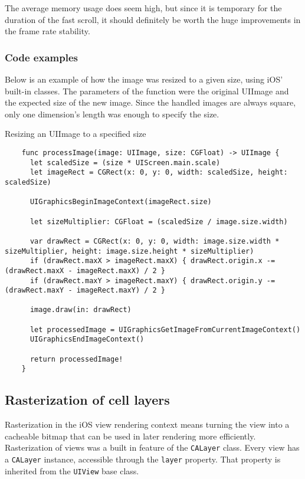 \documentclass[a4paper,12pt]{article}
\begin{document}
The average memory usage does seem high, but since it is temporary for the duration of the fast scroll, it should definitely be worth the huge improvements in the frame rate stability.

\subsubsection*{Code examples}
Below is an example of how the image was resized to a given size, using iOS' built-in classes. The parameters of the function were the original UIImage and the expected size of the new image. Since the handled images are always square, only one dimension's length was enough to specify the size.
\begin{listing}[H]
  \caption{Resizing an UIImage to a specified size}
  \begin{verbatim}
    func processImage(image: UIImage, size: CGFloat) -> UIImage {
      let scaledSize = (size * UIScreen.main.scale)
      let imageRect = CGRect(x: 0, y: 0, width: scaledSize, height: scaledSize)

      UIGraphicsBeginImageContext(imageRect.size)

      let sizeMultiplier: CGFloat = (scaledSize / image.size.width)

      var drawRect = CGRect(x: 0, y: 0, width: image.size.width * sizeMultiplier, height: image.size.height * sizeMultiplier)
      if (drawRect.maxX > imageRect.maxX) { drawRect.origin.x -= (drawRect.maxX - imageRect.maxX) / 2 }
      if (drawRect.maxY > imageRect.maxY) { drawRect.origin.y -= (drawRect.maxY - imageRect.maxY) / 2 }

      image.draw(in: drawRect)

      let processedImage = UIGraphicsGetImageFromCurrentImageContext()
      UIGraphicsEndImageContext()

      return processedImage!
    }
  \end{verbatim}
\end{listing}


\subsection{Rasterization of cell layers}
Rasterization in the iOS view rendering context means turning the view into a cacheable bitmap that can be used in later rendering more efficiently. Rasterization of views was a built in feature of the \texttt{CALayer} class. Every view has a \texttt{CALayer} instance, accessible through the \texttt{layer} property. That property is inherited from the \texttt{UIView} base class.
\end{document}
